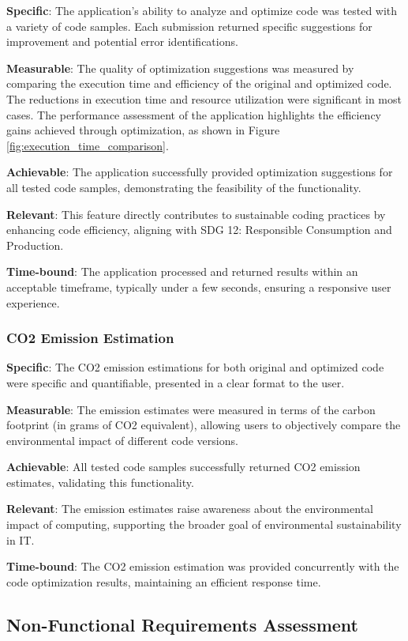 \documentclass[conference,compsoc]{IEEEtran}
\begin{document}
\textbf{Specific}: The application's ability to analyze and optimize code was tested with a variety of code samples. Each submission returned specific suggestions for improvement and potential error identifications.

\textbf{Measurable}: The quality of optimization suggestions was measured by comparing the execution time and efficiency of the original and optimized code. The reductions in execution time and resource utilization were significant in most cases. The performance assessment of the application highlights the efficiency gains achieved through optimization, as shown in Figure \ref{fig:execution_time_comparison}.

\textbf{Achievable}: The application successfully provided optimization suggestions for all tested code samples, demonstrating the feasibility of the functionality.

\textbf{Relevant}: This feature directly contributes to sustainable coding practices by enhancing code efficiency, aligning with SDG 12: Responsible Consumption and Production.

\textbf{Time-bound}: The application processed and returned results within an acceptable timeframe, typically under a few seconds, ensuring a responsive user experience.

\subsubsection{CO2 Emission Estimation}
\textbf{Specific}: The CO2 emission estimations for both original and optimized code were specific and quantifiable, presented in a clear format to the user.

\textbf{Measurable}: The emission estimates were measured in terms of the carbon footprint (in grams of CO2 equivalent), allowing users to objectively compare the environmental impact of different code versions.

\textbf{Achievable}: All tested code samples successfully returned CO2 emission estimates, validating this functionality.

\textbf{Relevant}: The emission estimates raise awareness about the environmental impact of computing, supporting the broader goal of environmental sustainability in IT.

\textbf{Time-bound}: The CO2 emission estimation was provided concurrently with the code optimization results, maintaining an efficient response time.

\subsection{Non-Functional Requirements Assessment}
\end{document}
